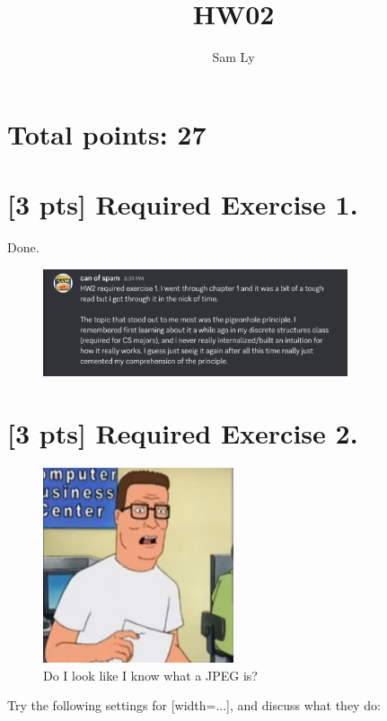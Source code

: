 \documentclass{article}
\title{HW02}
\author{Sam Ly}
\begin{document}
\maketitle


\section*{Total points: 27}

\section*{[3 pts] Required Exercise 1.}

Done.

\begin{figure}[htbp]
    \centering
    \includegraphics[width=0.8\textwidth]{figures/prompt.png}
\end{figure}

\section*{[3 pts] Required Exercise 2.}

\begin{figure}[h]
    \centering
    \includegraphics[width=0.5\textwidth]{figures/hank.jpeg}
    \caption{Do I look like I know what a JPEG is?}
\end{figure}

Try the following settings for [width=...], and discuss what they do: 
\end{document}
